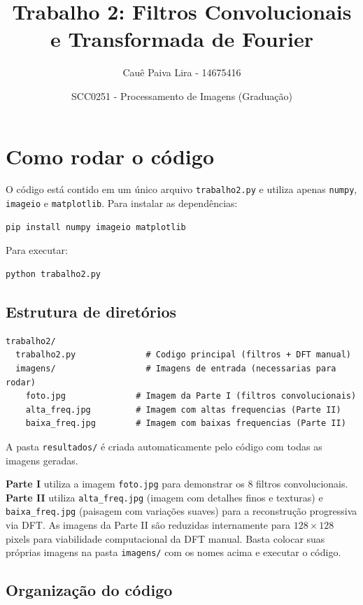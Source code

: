\documentclass[12pt,a4paper]{article}
\title{Trabalho 2: Filtros Convolucionais e Transformada de Fourier}
\author{Cauê Paiva Lira - 14675416}
\date{SCC0251 - Processamento de Imagens (Graduação)}
\begin{document}
\maketitle

\section{Como rodar o código}

O código está contido em um único arquivo \texttt{trabalho2.py} e utiliza apenas \texttt{numpy}, \texttt{imageio} e \texttt{matplotlib}. Para instalar as dependências:

\begin{lstlisting}[language=bash]
pip install numpy imageio matplotlib
\end{lstlisting}

Para executar:

\begin{lstlisting}[language=bash]
python trabalho2.py
\end{lstlisting}

\subsection{Estrutura de diretórios}

\begin{lstlisting}
trabalho2/
  trabalho2.py              # Codigo principal (filtros + DFT manual)
  imagens/                  # Imagens de entrada (necessarias para rodar)
    foto.jpg              # Imagem da Parte I (filtros convolucionais)
    alta_freq.jpg         # Imagem com altas frequencias (Parte II)
    baixa_freq.jpg        # Imagem com baixas frequencias (Parte II)
\end{lstlisting}

A pasta \texttt{resultados/} é criada automaticamente pelo código com todas as imagens geradas.

\textbf{Parte I} utiliza a imagem \texttt{foto.jpg} para demonstrar os 8 filtros convolucionais. \textbf{Parte II} utiliza \texttt{alta\_freq.jpg} (imagem com detalhes finos e texturas) e \texttt{baixa\_freq.jpg} (paisagem com variações suaves) para a reconstrução progressiva via DFT. As imagens da Parte II são reduzidas internamente para $128 \times 128$ pixels para viabilidade computacional da DFT manual. Basta colocar suas próprias imagens na pasta \texttt{imagens/} com os nomes acima e executar o código.

\subsection{Organização do código}
\end{document}
